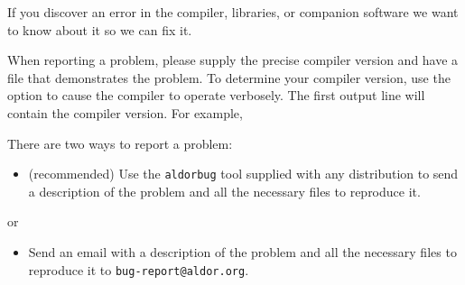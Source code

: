 
If you discover an error in the \asharp{} compiler, libraries,
or companion software we want to know about it so we can fix it.

When reporting a problem, please supply
the precise compiler version and
have a file that demonstrates the problem.
To determine your compiler version, use the  option
to cause the \asharp{} compiler to operate verbosely.
The first output line will contain the compiler version.  For example,


There are two ways to report a problem:
\begin{itemize}
\item (recommended) Use the {\tt aldorbug} tool supplied with any
\asharp{} distribution to send a description of the problem and all the
necessary files to reproduce it.
\end{itemize}
or
\begin{itemize}
\item Send an email with a description of the problem and all the
necessary files to reproduce it to {\tt bug-report@aldor.org}.
\end{itemize}

%
%
%
